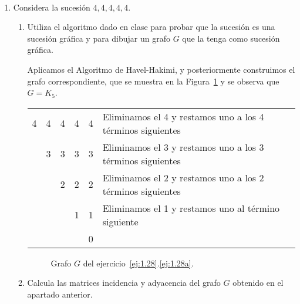 \begin{ejercicio}\label{ej:1.28}~
    \begin{enumerate}
        \item \label{ej:1.28a}
        Considera la sucesión $4,4,4,4,4$.
        \begin{enumerate}
            \item Utiliza el algoritmo dado en clase para probar que la sucesión es una sucesión gráfica y para dibujar un grafo $G$ que la tenga como sucesión gráfica.
            
            Aplicamos el Algoritmo de Havel-Hakimi, y posteriormente construimos el grafo correspondiente, que se muestra en la Figura~\ref{fig:1.28_1} y se observa que $G=K_5$.
            \begin{table}[H]
                \centering
                \begin{tabular}{ccccc|l}
                    4 & 4 & 4 & 4 & 4 & Eliminamos el 4 y restamos uno a los 4 términos siguientes\\
                      & 3 & 3 & 3 & 3 & Eliminamos el 3 y restamos uno a los 3 términos siguientes\\
                      &   & 2 & 2 & 2 & Eliminamos el 2 y restamos uno a los 2 términos siguientes\\
                      &   &   & 1 & 1 & Eliminamos el 1 y restamos uno al término siguiente\\
                      &   &   &   & 0 &
                \end{tabular}
            \end{table}
            \begin{figure}
                \centering
                \caption{Grafo $G$ del ejercicio~\ref{ej:1.28}.\ref{ej:1.28a}.}
                \label{fig:1.28_1}
            \end{figure}
            \item Calcula las matrices incidencia y adyacencia del grafo $G$ obtenido en el apartado anterior.\\
            

\end{enumerate}
\end{enumerate}
\end{ejercicio}
